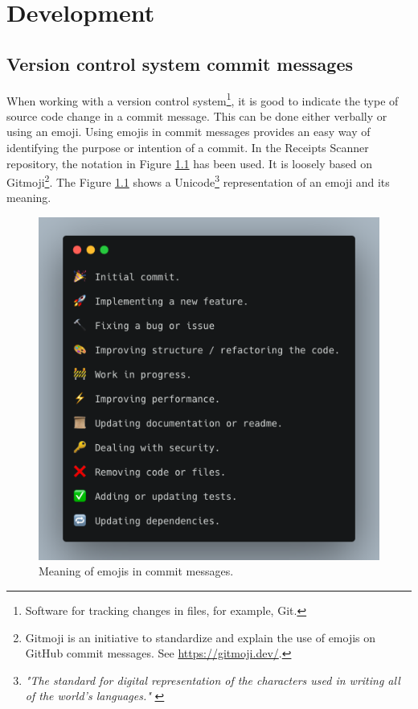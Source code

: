 \documentclass[
  digital, %
  table,   %
  oneside, %
  lof,     %
  lot,     %
]{fithesis3}
\begin{document}
\chapter{Development}
\section{Version control system commit messages}
When working with a version control system\footnote{Software for tracking changes in files, for example, Git.}, it is good to indicate the type of source code change in a commit message. This can be done either verbally or using an emoji.
Using emojis in commit messages provides an easy way of identifying the purpose or intention of a commit. In the Receipts Scanner repository, the notation in Figure \ref{fig:emoji_commits} has been used. It is loosely based on Gitmoji\footnote{Gitmoji is an initiative to standardize and explain the use of emojis on GitHub commit messages. See \url{https://gitmoji.dev/}.}. The Figure \ref{fig:emoji_commits} shows a Unicode\footnote{\textit{"The standard for digital representation of the characters used in writing all of the world's languages."} \cite{Unicode}} representation of an emoji and its meaning.

\begin{figure}
    \begin{center}
        \includegraphics[width=\textwidth]{figures/other/Emoji_commits}
    \end{center}
    \caption{Meaning of emojis in commit messages.}
    \label{fig:emoji_commits}
\end{figure}
\end{document}
